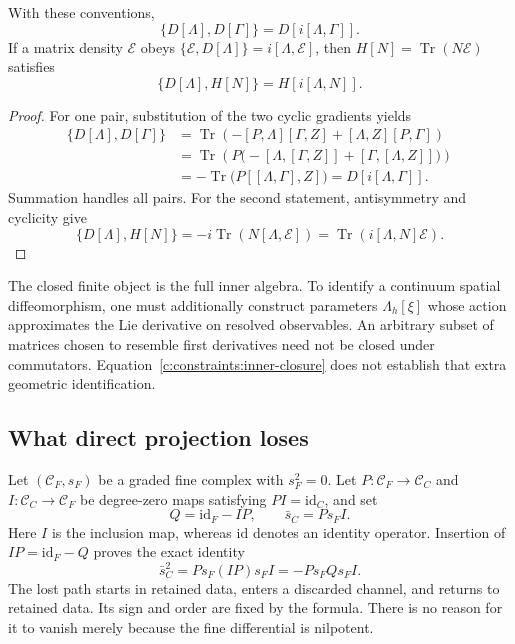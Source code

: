 \begin{proposition}
With these conventions,
\begin{equation}
 \{D[\Lambda],D[\Gamma]\}=D[i[\Lambda,\Gamma]].
 \label{c:constraints:inner-closure}
\end{equation}
If a matrix density $\mathcal E$ obeys
$\{\mathcal E,D[\Lambda]\}=i[\Lambda,\mathcal E]$,
then $H[N]=\operatorname{Tr}(N\mathcal E)$ satisfies
\begin{equation}
 \{D[\Lambda],H[N]\}=H[i[\Lambda,N]].
\end{equation}
\end{proposition}
\begin{proof}
For one pair, substitution of the two cyclic gradients yields
\begin{align}
 \{D[\Lambda],D[\Gamma]\}
 &=\operatorname{Tr}\left(
   -[P,\Lambda][\Gamma,Z]+[\Lambda,Z][P,\Gamma]\right)\\
 &=\operatorname{Tr}\left(P\bigl(
   -[\Lambda,[\Gamma,Z]]+[\Gamma,[\Lambda,Z]]\bigr)\right)\\
 &=-\operatorname{Tr}\bigl(P[[\Lambda,\Gamma],Z]\bigr)
   =D[i[\Lambda,\Gamma]].
\end{align}
Summation handles all pairs. For the second statement, antisymmetry and cyclicity give
\begin{equation}
 \{D[\Lambda],H[N]\}
 =-i\operatorname{Tr}(N[\Lambda,\mathcal E])
 =\operatorname{Tr}(i[\Lambda,N]\mathcal E).
\end{equation}
\end{proof}

The closed finite object is the full inner algebra. To identify a continuum spatial diffeomorphism, one must additionally construct parameters $\Lambda_h[\xi]$ whose action approximates the Lie derivative on resolved observables. An arbitrary subset of matrices chosen to resemble first derivatives need not be closed under commutators. Equation~\eqref{c:constraints:inner-closure} does not establish that extra geometric identification.

\subsection{What direct projection loses}
Let $(\mathcal C_F,s_F)$ be a graded fine complex with $s_F^2=0$. Let $P:\mathcal C_F\to\mathcal C_C$ and $I:\mathcal C_C\to\mathcal C_F$ be degree-zero maps satisfying $PI=\mathrm{id}_C$, and set
\begin{equation}
 Q=\mathrm{id}_F-IP,\qquad \bar s_C=Ps_FI.
\end{equation}
Here $I$ is the inclusion map, whereas $\mathrm{id}$ denotes an identity operator. Insertion of $IP=\mathrm{id}_F-Q$ proves the exact identity
\begin{equation}
 \bar s_C^2
 =Ps_F(IP)s_FI
 =-Ps_FQs_FI.
 \label{c:constraints:leakage}
\end{equation}
The lost path starts in retained data, enters a discarded channel, and returns to retained data. Its sign and order are fixed by the formula. There is no reason for it to vanish merely because the fine differential is nilpotent.

